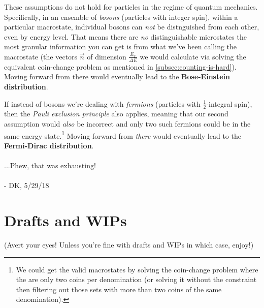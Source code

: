 \documentclass[letterpaper,12pt]{report}
\begin{document}
These assumptions do not hold for particles in the regime of quantum mechanics.
Specifically, in an ensemble of \emph{bosons} (particles with integer spin),
within a particular macrostate,
individual bosons can \emph{not} be distnguished from each other, even by energy level.
That means there are \emph{no} distinguishable microstates \textemdash{} the most granular
information you can get is from what we've been calling the macrostate
(the vectors \(\vec{n}\) of dimension \(\frac{E_T}{\Delta E}\) we would calculate via
solving the equivalent coin-change problem as mentioned in
\ref{subsec:counting-is-hard}).
Moving forward from there would eventually
lead to the \textbf{Bose-Einstein distribution}.\par

If instead of bosons we're dealing with \emph{fermions} (particles with
\(\frac{1}{2}\)-integral spin), then the \emph{Pauli exclusion principle} also applies,
meaning that our second assumption would \emph{also} be incorrect and only two such
fermions could be in the same energy state.\footnote{
  We could get the valid macrostates
  by solving the coin-change problem where the are only two coins per denomination
  (or solving it without the constraint then filtering out those sets with more than
  two coins of the same denomination).
}
Moving forward from \emph{there} would
eventually lead to the \textbf{Fermi-Dirac distribution}.
\\
\\
...Phew, that was exhausting!
\\
\\
- DK, 5/29/18


\chapter{Drafts and WIPs}\label{drafts-and-wips}

(Avert your eyes! Unless you're fine with drafts and WIPs \textemdash{} in which case, enjoy!)

\end{document}
